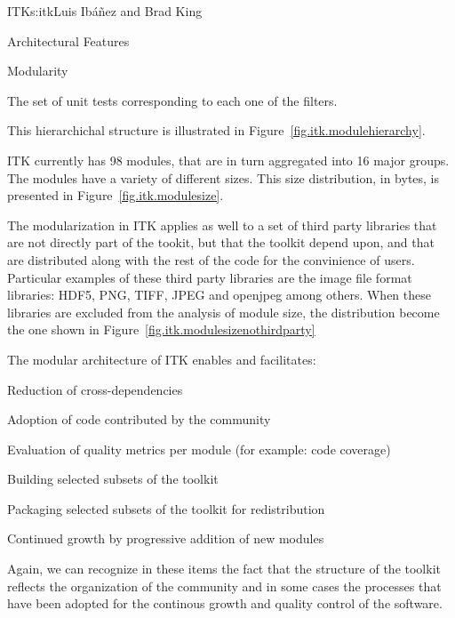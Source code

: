 \begin{aosachapter}{ITK}{s:itk}{Luis Ib\'{a}\~{n}ez and Brad King}
\begin{aosasect1}{Architectural Features}
\begin{aosasect2}{Modularity}
\begin{aosaenumerate}
\item The set of unit tests corresponding to each one of the filters.

\end{aosaenumerate}

This hierarchichal structure is illustrated in
Figure~\ref{fig.itk.modulehierarchy}.



ITK currently has 98 modules, that are in turn aggregated into 16 major groups.
The modules have a variety of different sizes. This size distribution, in
bytes, is presented in Figure~\ref{fig.itk.modulesize}.


The modularization in ITK applies as well to a set of third party libraries
that are not directly part of the tookit, but that the toolkit depend upon, and
that are distributed along with the rest of the code for the convinience of
users. Particular examples of these third party libraries are the image file
format libraries: HDF5, PNG, TIFF, JPEG and openjpeg among others. When these
libraries are excluded from the analysis of module size, the distribution
become the one shown in Figure~\ref{fig.itk.modulesizenothirdparty}

The modular architecture of ITK enables and facilitates:

\begin{aosaitemize}
\item Reduction of cross-dependencies
\item Adoption of code contributed by the community
\item Evaluation of quality metrics per module (for example: code coverage)
\item Building selected subsets of the toolkit
\item Packaging selected subsets of the toolkit for redistribution
\item Continued growth by progressive addition of new modules
\end{aosaitemize}
\end{aosasect2}

Again, we can recognize in these items the fact that the structure of the
toolkit reflects the organization of the community and in some cases the
processes that have been adopted for the continous growth and quality control
of the software.


\end{aosasect1}
\end{aosachapter}
